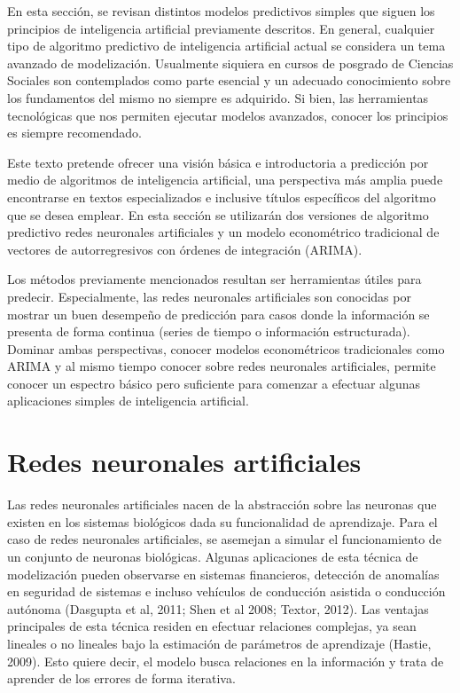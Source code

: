 \documentclass[letterpaper,12pt, spanish, oneside]{book} %
\begin{document}
En esta sección, se revisan distintos modelos predictivos simples que siguen los principios de inteligencia artificial previamente descritos. En general, cualquier tipo de algoritmo predictivo de inteligencia artificial actual se considera un tema avanzado de modelización. Usualmente siquiera en cursos de posgrado de Ciencias Sociales son contemplados como parte esencial y un adecuado conocimiento sobre los fundamentos del mismo no siempre es adquirido. Si bien, las herramientas tecnológicas que nos permiten ejecutar modelos avanzados, conocer los principios es siempre recomendado.

Este texto pretende ofrecer una visión básica e introductoria a predicción por medio de algoritmos de inteligencia artificial, una perspectiva más amplia puede encontrarse en textos especializados e inclusive títulos específicos del algoritmo que se desea emplear. En esta sección se utilizarán dos versiones de algoritmo predictivo redes neuronales artificiales y un modelo econométrico tradicional de vectores de autorregresivos con órdenes de integración (ARIMA). 

Los métodos previamente mencionados resultan ser herramientas útiles para predecir. Especialmente, las redes neuronales artificiales son conocidas por mostrar un buen desempeño de predicción para casos donde la información se presenta de forma continua (series de tiempo o información estructurada). Dominar ambas perspectivas, conocer modelos econométricos tradicionales como ARIMA y al mismo tiempo conocer sobre redes neuronales artificiales, permite conocer un espectro básico pero suficiente para comenzar a efectuar algunas aplicaciones simples de inteligencia artificial.

\section{Redes neuronales artificiales}

Las redes neuronales artificiales nacen de la abstracción sobre las neuronas que existen en los sistemas biológicos dada su funcionalidad de aprendizaje. Para el caso de redes neuronales artificiales, se asemejan a simular el funcionamiento de un conjunto de neuronas biológicas. Algunas aplicaciones de esta técnica de modelización pueden observarse en sistemas financieros, detección de anomalías en seguridad de sistemas e incluso vehículos de conducción asistida o conducción autónoma (Dasgupta et al, 2011; Shen et al 2008; Textor, 2012). Las ventajas principales de esta técnica residen en efectuar relaciones complejas, ya sean lineales o no lineales bajo la estimación de parámetros de aprendizaje (Hastie, 2009). Esto quiere decir, el modelo busca relaciones en la información y trata de aprender de los errores de forma iterativa.
\end{document}
